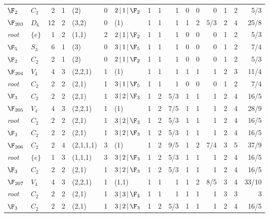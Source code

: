 \begin{landscape}
{\begin{longtable}{@{}l l r r l r l rrr rrr rrr@{}}
\quad$\F_{2}$ & $C_{2}$ & 2 & 1 & (2) & 0 & $2\,|\,1\,|\,\F_{2}$ & 1 & 1 & 1 & 0 & 0 & 0 & 1 & 2 & 5/3 \\
\addlinespace[3pt]
\textbf{$\F_{203}$} & $D_{6}$ & 12 & 2 & (3,2) & 0 & (1) & 1 & 1 & 1 & 1 & 2 & 5/3 & 2 & 4 & 25/8 \\
\quad\textit{root} & $\{e\}$ & 1 & 2 & (1,1) & 2 & $2\,|\,1\,|\,\F_{2}$ & 1 & 1 & 1 & 0 & 0 & 0 & 1 & 2 & 5/3 \\
\quad$\F_{5}$ & $S_{3}$ & 6 & 1 & (3) & 0 & $3\,|\,1\,|\,\F_{5}$ & 1 & 1 & 1 & 0 & 0 & 0 & 1 & 2 & 7/4 \\
\quad$\F_{2}$ & $C_{2}$ & 2 & 1 & (2) & 0 & $2\,|\,1\,|\,\F_{2}$ & 1 & 1 & 1 & 0 & 0 & 0 & 1 & 2 & 5/3 \\
\addlinespace[3pt]
\textbf{$\F_{204}$} & $V_{4}$ & 4 & 3 & (2,2,1) & 1 & (1) & 1 & 1 & 1 & 1 & 1 & 1 & 2 & 3 & 11/4 \\
\quad\textit{root} & $C_{2}$ & 2 & 2 & (2,1) & 1 & $3\,|\,1\,|\,\F_{5}$ & 1 & 1 & 1 & 0 & 0 & 0 & 1 & 2 & 7/4 \\
\quad$\F_{3}$ & $C_{2}$ & 2 & 2 & (2,1) & 1 & $3\,|\,2\,|\,\F_{3}$ & 1 & 2 & 5/3 & 1 & 1 & 1 & 2 & 4 & 16/5 \\
\addlinespace[3pt]
\textbf{$\F_{205}$} & $V_{4}$ & 4 & 3 & (2,2,1) & 1 & (1) & 1 & 2 & 7/5 & 1 & 1 & 1 & 2 & 4 & 28/9 \\
\quad\textit{root} & $C_{2}$ & 2 & 2 & (2,1) & 1 & $3\,|\,2\,|\,\F_{3}$ & 1 & 2 & 5/3 & 1 & 1 & 1 & 2 & 4 & 16/5 \\
\quad$\F_{3}$ & $C_{2}$ & 2 & 2 & (2,1) & 1 & $3\,|\,2\,|\,\F_{3}$ & 1 & 2 & 5/3 & 1 & 1 & 1 & 2 & 4 & 16/5 \\
\addlinespace[3pt]
\textbf{$\F_{206}$} & $C_{2}$ & 2 & 4 & (2,1,1,1) & 3 & (1) & 1 & 2 & 9/5 & 1 & 2 & 7/4 & 3 & 5 & 37/9 \\
\quad\textit{root} & $\{e\}$ & 1 & 3 & (1,1,1) & 3 & $3\,|\,2\,|\,\F_{3}$ & 1 & 2 & 5/3 & 1 & 1 & 1 & 2 & 4 & 16/5 \\
\quad$\F_{3}$ & $C_{2}$ & 2 & 2 & (2,1) & 1 & $3\,|\,2\,|\,\F_{3}$ & 1 & 2 & 5/3 & 1 & 1 & 1 & 2 & 4 & 16/5 \\
\addlinespace[3pt]
\textbf{$\F_{207}$} & $V_{4}$ & 4 & 3 & (2,2,1) & 1 & (1,1) & 1 & 1 & 1 & 1 & 2 & 8/5 & 3 & 4 & 33/10 \\
\quad\textit{root} & $C_{2}$ & 2 & 2 & (2,1) & 1 & $3\,|\,3\,|\,\F_{4}$ & 1 & 1 & 1 & 1 & 1 & 1 & 3 & 3 & 3 \\
\quad$\F_{3}$ & $C_{2}$ & 2 & 2 & (2,1) & 1 & $3\,|\,2\,|\,\F_{3}$ & 1 & 2 & 5/3 & 1 & 1 & 1 & 2 & 4 & 16/5 \\

\end{longtable}}
\end{landscape}
